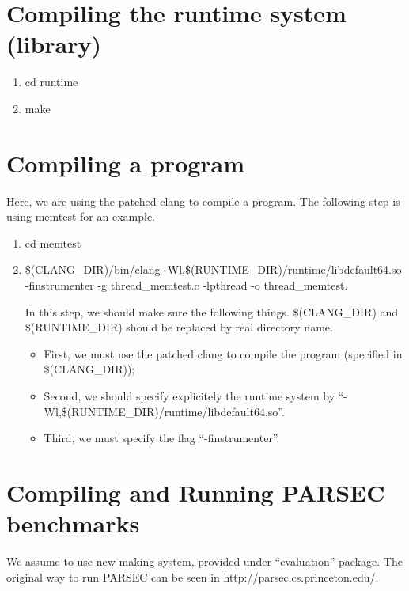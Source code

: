 \documentclass[10pt]{article}
\begin{document}
\section{Compiling the runtime system (library)}
\begin{enumerate}
\item
cd runtime
\item
make
\end{enumerate}

\section{Compiling a program}
Here, we are using the patched clang to compile a program. 
The following step is using memtest for an example. 
\begin{enumerate}
\item 
cd memtest
\item
 \$(CLANG\_DIR)/bin/clang -Wl,\$(RUNTIME\_DIR)/runtime/libdefault64.so -finstrumenter -g thread\_memtest.c -lpthread -o thread\_memtest.

In this step, we should make sure the following things. \$(CLANG\_DIR) and \$(RUNTIME\_DIR) should be replaced by real directory name.
\begin{itemize}
\item
First, we must use the patched clang to compile the program (specified in \$(CLANG\_DIR));

\item
Second, we should specify explicitely the runtime system 
by ``-Wl,\$(RUNTIME\_DIR)/runtime/libdefault64.so''.

\item
Third, we must specify the flag ``-finstrumenter''.
\end{itemize}

\end{enumerate}

\section{Compiling and Running PARSEC benchmarks}
We assume to use new making system, provided under ``evaluation'' package.
The original way to run PARSEC can be seen in http://parsec.cs.princeton.edu/.
\end{document}
